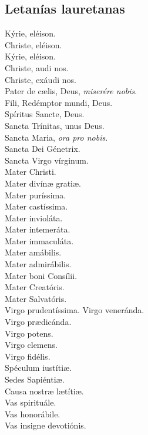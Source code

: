 \documentclass[./rosary.tex]{subfiles}
\begin{document}
\subsection*{Letanías lauretanas}

\begin{multicols}{2}
    Kýrie, eléison.\\
    Christe, eléison.\\
    Kýrie, eléison.\\
    Christe, audi nos.\\
    Christe, exáudi nos.\\
    Pater de cælis, Deus, \emph{miserére nobis}.\\
    Fili, Redémptor mundi, Deus.\\
    Spíritus Sancte, Deus.\\
    Sancta Trínitas, unus Deus.\\
    Sancta Maria, \emph{ora pro nobis}.\\
    Sancta Dei Génetrix.\\
    Sancta Virgo vírginum.\\
    Mater Christi.\\
    Mater divínæ gratiæ.\\
    Mater puríssima.\\
    Mater castíssima.\\
    Mater invioláta.\\
    Mater intemeráta.\\
    Mater immaculáta.\\
    Mater amábilis.\\
    Mater admirábilis.\\
    Mater boni Consílii.\\
    Mater Creatóris.\\
    Mater Salvatóris.\\
    Virgo pru­den­tíssima.
    Virgo veneránda.\\
    Virgo prædicánda.\\
    Virgo potens.\\
    Virgo clemens.\\
    Virgo fidélis.\\
    Spéculum iustítiæ.\\
    Sedes Sapiéntiæ.\\
    Causa nostræ lætítiæ.\\
    Vas spirituále.\\
    Vas honorábile.\\
    Vas insigne devotiónis.\\

\end{multicols}
\end{document}
